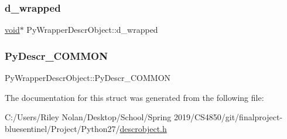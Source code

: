 \subsubsection{\texorpdfstring{d\_wrapped}{d\_wrapped}}
{\footnotesize\ttfamily \mbox{\hyperlink{_s_d_l__opengles2__gl2ext_8h_ae5d8fa23ad07c48bb609509eae494c95}{void}}$\ast$ Py\+Wrapper\+Descr\+Object\+::d\+\_\+wrapped}

\mbox{\label{struct_py_wrapper_descr_object_af009d6c8b2a67ec479a9dea3db47e59b}} 
\subsubsection{\texorpdfstring{PyDescr\_COMMON}{PyDescr\_COMMON}}
{\footnotesize\ttfamily Py\+Wrapper\+Descr\+Object\+::\+Py\+Descr\+\_\+\+C\+O\+M\+M\+ON}



The documentation for this struct was generated from the following file\+:\begin{DoxyCompactItemize}
\item 
C\+:/\+Users/\+Riley Nolan/\+Desktop/\+School/\+Spring 2019/\+C\+S4850/git/finalproject-\/bluesentinel/\+Project/\+Python27/\mbox{\hyperlink{descrobject_8h}{descrobject.\+h}}\end{DoxyCompactItemize}

